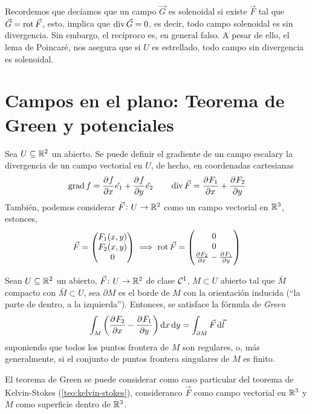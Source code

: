 Recordemos que decíamos que un campo $\vec{G}$ es solenoidal si existe $\vec{F}$ tal que $\vec{G} = \operatorname{rot} \vec{F}$, esto, implica
que $\operatorname{div} \vec{G} = 0$, es decir, todo campo solenoidal es sin divergencia. Sin embargo, el recíproco es, en general falso. A pesar de
ello, el lema de Poincar\'e, nos asegura que si $U$ es estrellado, todo campo sin divergencia es solenoidal.

\section{Campos en el plano: Teorema de Green y potenciales}

\begin{defi}
    Sea $U \subseteq \mathbb{R}^2$ un abierto. Se puede definir el gradiente de un campo escalary la divergencia de un campo
    vectorial en $U$, de hecho, en coordenadas cartesianas
    \[
        \operatorname{grad} f = \frac{\partial^{} f}{\partial x^{}} \hat{e_1} + \frac{\partial^{} f}{\partial y^{}} \hat{e_2} \qquad
        \operatorname{div} \vec{F} = \frac{\partial^{} F_1}{\partial x^{}} + \frac{\partial^{} F_2}{\partial y^{}}
    \]
    Tambi\'en, podemos considerar $\vec{F} \colon U \to \mathbb{R}^2$ como un campo vectorial en $\mathbb{R}^3$, estonces,
    \[
        \vec{F} = 
        \begin{pmatrix}
            F_1(x,y) \\ F_2(x,y) \\ 0
        \end{pmatrix} \implies
        \operatorname{rot} \vec{F} =
        \begin{pmatrix}
            0 \\ 0 \\ \frac{\partial^{} F_2}{\partial x^{}} - \frac{\partial^{} F_1}{\partial y^{}}
        \end{pmatrix}
    \]
\end{defi}

\begin{teo}[de Green]
    Sean $U \subseteq \mathbb{R}^2$ un abierto, $\vec{F} \colon U \to \mathbb{R}^2$ de clase $\mathcal{C}^1$, $M \subset U$ abierto tal que
    $\bar{M}$ compacto con $\bar{M} \subset U$, sea $\partial M$ es el borde de $M$ con la orientación inducida (``la parte de dentro,
    a la izquierda''). Entonces, se satisface la fórmula de \emph{Green}
    \[
        \int_M \left( \pdv{F_2}{x} - \pdv{F_1}{y} \right) \dif x \dif y = \int_{\partial M} \vec{F} \dif \vec{l}
    \]
    suponiendo que todos los puntos frontera de $M$ son regulares, o, más generalmente, si el conjunto de puntos frontera singulares
    de $M$ es finito.
\end{teo}

\begin{obs}
    El teorema de Green se puede considerar como caso particular del teorema de Kelvin-Stokes (\ref{teo:kelvin-stokes}), consideranco $\vec{F}$
    como campo vectorial en $\mathbb{R}^3$ y $M$ como superficie dentro de $\mathbb{R}^3$.
\end{obs}

